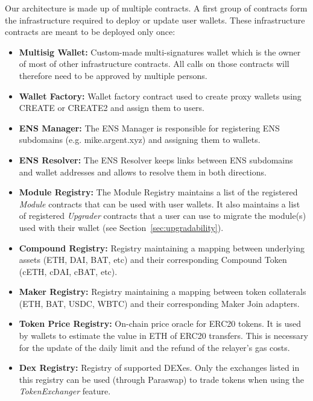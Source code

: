 \documentclass[12pt]{article}
\begin{document}
Our architecture is made up of multiple contracts. A first group of contracts form the infrastructure required to deploy or update user wallets. These infrastructure contracts are meant to be deployed only once:
\begin{itemize}
    \item \textbf{Multisig Wallet:} Custom-made multi-signatures wallet which is the owner of most of other infrastructure contracts. All calls on those contracts will therefore need to be approved by multiple persons.
    \item \textbf{Wallet Factory:} Wallet factory contract used to create proxy wallets using CREATE or CREATE2 and assign them to users.
    \item \textbf{ENS Manager:} The ENS Manager is responsible for registering ENS subdomains (e.g. mike.argent.xyz) and assigning them to wallets.
    \item \textbf{ENS Resolver:} The ENS Resolver keeps links between ENS subdomains and wallet addresses and allows to resolve them in both directions.
    \item \textbf{Module Registry:} The Module Registry maintains a list of the registered \emph{Module} contracts that can be used with user wallets. It also maintains a list of registered \emph{Upgrader} contracts that a user can use to migrate the module(s) used with their wallet (see Section~\ref{sec:upgradability}).
    \item \textbf{Compound Registry:} Registry maintaining a mapping between underlying assets (ETH, DAI, BAT, etc) and their corresponding Compound Token (cETH, cDAI, cBAT, etc).
    \item \textbf{Maker Registry:} Registry maintaining a mapping between token collaterals (ETH, BAT, USDC, WBTC) and their corresponding Maker Join adapters.
    \item \textbf{Token Price Registry:} On-chain price oracle for ERC20 tokens. It is used by wallets to estimate the value in ETH of ERC20 transfers. This is necessary for the update of the daily limit and the refund of the relayer's gas costs. 
    \item \textbf{Dex Registry:} Registry of supported DEXes. Only the exchanges listed in this registry can be used (through Paraswap) to trade tokens when using the \emph{TokenExchanger} feature.
\end{itemize}
\end{document}
